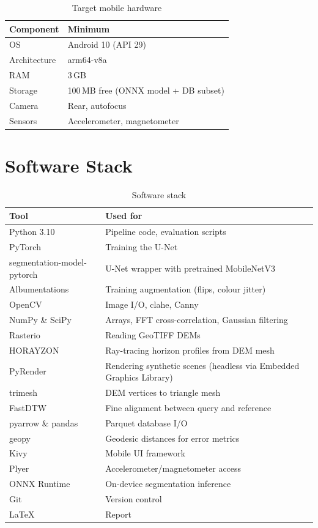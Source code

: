 \begin{table}[H]
\centering
\caption{Target mobile hardware}
\label{tab:target_hardware}
\begin{tabular}{ll}
\toprule
\textbf{Component} & \textbf{Minimum} \\
\midrule
OS & Android 10 (API 29) \\
Architecture & arm64-v8a \\
RAM & 3\,GB \\
Storage & 100\,MB free (ONNX model + DB subset) \\
Camera & Rear, autofocus \\
Sensors & Accelerometer, magnetometer \\
\bottomrule
\end{tabular}
\end{table}

\section{Software Stack}

\begin{table}[H]
\centering
\caption{Software stack}
\label{tab:software_stack}
\begin{tabularx}{0.95\textwidth}{l X}
\toprule
\textbf{Tool} & \textbf{Used for} \\
\midrule
Python 3.10 & Pipeline code, evaluation scripts \\
PyTorch & Training the U-Net \\
segmentation-model-pytorch & U-Net wrapper with pretrained MobileNetV3 \\
Albumentations & Training augmentation (flips, colour jitter) \\
OpenCV & Image I/O, \Gls{clahe}, Canny \\
NumPy \& SciPy & Arrays, FFT cross-correlation, Gaussian filtering \\
Rasterio & Reading GeoTIFF DEMs \\
HORAYZON & Ray-tracing horizon profiles from DEM mesh \\
PyRender & Rendering synthetic scenes (headless via Embedded Graphics Library) \\
trimesh & DEM vertices to triangle mesh \\
FastDTW & Fine alignment between query and reference \\
pyarrow \& pandas & Parquet database I/O \\
geopy & Geodesic distances for error metrics \\
Kivy & Mobile UI framework \\
Plyer & Accelerometer/magnetometer access \\
ONNX Runtime & On-device segmentation inference \\
Git & Version control \\
\LaTeX & Report \\
\bottomrule
\end{tabularx}
\end{table}
